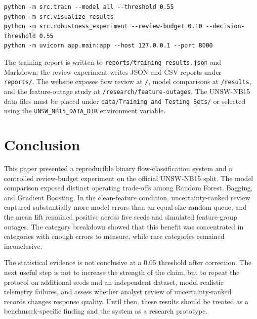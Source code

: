 \documentclass[conference]{IEEEtran}
\begin{document}
\begin{verbatim}
python -m src.train --model all --threshold 0.55
python -m src.visualize_results
python -m src.robustness_experiment --review-budget 0.10 --decision-threshold 0.55
python -m uvicorn app.main:app --host 127.0.0.1 --port 8000
\end{verbatim}

The training report is written to \texttt{reports/training\_results.json} and Markdown; the review experiment writes JSON and CSV reports under \texttt{reports/}. The website exposes flow review at \texttt{/}, model comparisons at \texttt{/results}, and the feature-outage study at \texttt{/research/feature-outages}. The UNSW-NB15 data files must be placed under \texttt{data/Training and Testing Sets/} or selected using the \texttt{UNSW\_NB15\_DATA\_DIR} environment variable.

\section{Conclusion}
This paper presented a reproducible binary flow-classification system and a controlled review-budget experiment on the official UNSW-NB15 split. The model comparison exposed distinct operating trade-offs among Random Forest, Bagging, and Gradient Boosting. In the clean-feature condition, uncertainty-ranked review captured substantially more model errors than an equal-size random queue, and the mean lift remained positive across five seeds and simulated feature-group outages. The category breakdown showed that this benefit was concentrated in categories with enough errors to measure, while rare categories remained inconclusive.

The statistical evidence is not conclusive at a 0.05 threshold after correction. The next useful step is not to increase the strength of the claim, but to repeat the protocol on additional seeds and an independent dataset, model realistic telemetry failures, and assess whether analyst review of uncertainty-ranked records changes response quality. Until then, these results should be treated as a benchmark-specific finding and the system as a research prototype.
\end{document}
